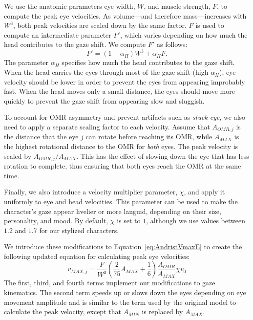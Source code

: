 We use the anatomic parameters eye width, $W$, and muscle strength, $F$, to compute the peak eye velocities. As volume---and therefore mass---increases with $W^3$, both peak velocities are scaled down by the same factor. $F$ is used to compute an intermediate parameter $F'$, which varies depending on how much the head contributes to the gaze shift. We compute $F'$ as follows:
%
\begin{equation}
F' = ( 1 - \alpha_H ) W^3 + \alpha_H F.
\end{equation}
%
The parameter $\alpha_H$ specifies how much the head contributes to the gaze shift. When the head carries the eyes through most of the gaze shift (high $\alpha_H$), eye velocity should be lower in order to prevent the eyes from appearing improbably fast. When the head moves only a small distance, the eyes should move more quickly to prevent the gaze shift from appearing slow and sluggish.

To account for OMR asymmetry and prevent artifacts such as \textit{stuck eye}, we also need to apply a separate scaling factor to each velocity. Assume that $A_{OMR,j}$ is the distance that the eye $j$ can rotate before reaching its OMR, while $A_{MAX}$ is the highest rotational distance to the OMR for \emph{both} eyes. The peak velocity is scaled by $A_{OMR,j}/A_{MAX}$. This has the effect of slowing down the eye that has less rotation to complete, thus ensuring that both eyes reach the OMR at the same time.

Finally, we also introduce a velocity multiplier parameter, $\chi$, and apply it uniformly to eye and head velocities. This parameter can be used to make the character's gaze appear livelier or more languid, depending on their size, personality, and mood. By default, $\chi$ is set to $1$, although we use values between $1.2$ and $1.7$ for our stylized characters.

We introduce these modifications to Equation~\ref{eq:AndristVmaxE} to create the following updated equation for calculating peak eye velocities:
%
\begin{equation}
v_{MAX,j} = \frac{F}{W^3}( \frac{2}{75} A_{MAX} + \frac{1}{6} ) \frac{A_{OMR}}{A_{MAX}} \chi v_0%
\end{equation}
%
The first, third, and fourth terms implement our modifications to gaze kinematics. The second term speeds up or slows down the eyes depending on eye movement amplitude and is similar to the term used by the original model to calculate the peak velocity, except that $A_{MIN}$ is replaced by $A_{MAX}$.

